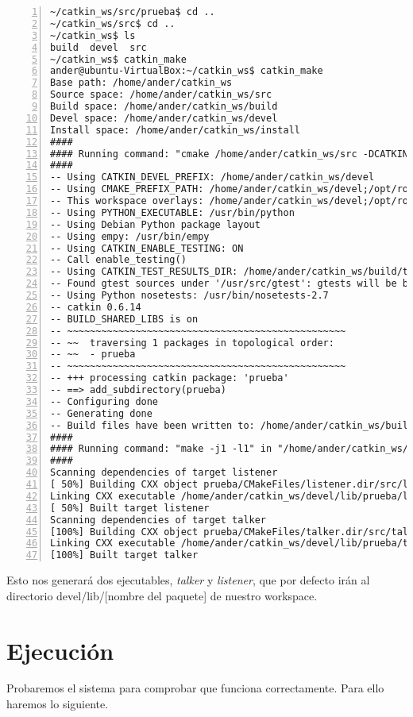 	\begin{lstlisting}[style=consola,numbers=left]
~/catkin_ws/src/prueba$ cd ..
~/catkin_ws/src$ cd ..
~/catkin_ws$ ls
build  devel  src
~/catkin_ws$ catkin_make
ander@ubuntu-VirtualBox:~/catkin_ws$ catkin_make
Base path: /home/ander/catkin_ws
Source space: /home/ander/catkin_ws/src
Build space: /home/ander/catkin_ws/build
Devel space: /home/ander/catkin_ws/devel
Install space: /home/ander/catkin_ws/install
####
#### Running command: "cmake /home/ander/catkin_ws/src -DCATKIN_DEVEL_PREFIX=/home/ander/catkin_ws/devel -DCMAKE_INSTALL_PREFIX=/home/ander/catkin_ws/install -G Unix Makefiles" in "/home/ander/catkin_ws/build"
####
-- Using CATKIN_DEVEL_PREFIX: /home/ander/catkin_ws/devel
-- Using CMAKE_PREFIX_PATH: /home/ander/catkin_ws/devel;/opt/ros/indigo
-- This workspace overlays: /home/ander/catkin_ws/devel;/opt/ros/indigo
-- Using PYTHON_EXECUTABLE: /usr/bin/python
-- Using Debian Python package layout
-- Using empy: /usr/bin/empy
-- Using CATKIN_ENABLE_TESTING: ON
-- Call enable_testing()
-- Using CATKIN_TEST_RESULTS_DIR: /home/ander/catkin_ws/build/test_results
-- Found gtest sources under '/usr/src/gtest': gtests will be built
-- Using Python nosetests: /usr/bin/nosetests-2.7
-- catkin 0.6.14
-- BUILD_SHARED_LIBS is on
-- ~~~~~~~~~~~~~~~~~~~~~~~~~~~~~~~~~~~~~~~~~~~~~~~~~
-- ~~  traversing 1 packages in topological order:
-- ~~  - prueba
-- ~~~~~~~~~~~~~~~~~~~~~~~~~~~~~~~~~~~~~~~~~~~~~~~~~
-- +++ processing catkin package: 'prueba'
-- ==> add_subdirectory(prueba)
-- Configuring done
-- Generating done
-- Build files have been written to: /home/ander/catkin_ws/build
####
#### Running command: "make -j1 -l1" in "/home/ander/catkin_ws/build"
####
Scanning dependencies of target listener
[ 50%] Building CXX object prueba/CMakeFiles/listener.dir/src/listener.cpp.o
Linking CXX executable /home/ander/catkin_ws/devel/lib/prueba/listener
[ 50%] Built target listener
Scanning dependencies of target talker
[100%] Building CXX object prueba/CMakeFiles/talker.dir/src/talker.cpp.o
Linking CXX executable /home/ander/catkin_ws/devel/lib/prueba/talker
[100%] Built target talker
	\end{lstlisting}
	
	Esto nos generará dos ejecutables, \emph{talker} y \emph{listener}, que por defecto irán al directorio devel/lib/[nombre del paquete] de nuestro workspace.
	
	\section{Ejecución}
	Probaremos el sistema para comprobar que funciona correctamente. Para ello haremos lo siguiente.
	
